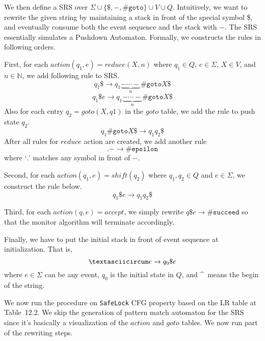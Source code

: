 \documentclass{article}
\begin{document}
\begin{enumerate}
We then define a SRS over $\Sigma \cup \{\$, -, \texttt{\#goto}\} \cup V \cup Q$.
Intuitively, we want to rewrite the given string by maintaining a stack in front
of the special symbol \$,
and eventually consume both the event sequence and the stack with $-$.
The SRS essentially simulates a Pushdown Automaton.
Formally, we constructs the rules in following orders.

First, for each $action(q_1, e) = reduce(X, n)$ where $q_1 \in Q$,
$e \in \Sigma$, $X \in V$, and $n \in \mathbb{N}$, we add following rule to SRS.
$$
    q_1\$ \to q_1 \underbrace{- \cdots -}_{n} \texttt{\#goto} X\$
$$$$
    q_1\$e \to q_1 \underbrace{- \cdots -}_{n} \texttt{\#goto} X\$
$$
Also for each entry $q_2 = goto(X, q1)$ in the $goto$ table,
we add the rule to push state $q_2$.
$$
    q_1 \texttt{\#goto} X \$ \to q_1 q_2 \$
$$
After all rules for $reduce$ action are created, we add another rule
$$
    . - \to \texttt{\#epsilon}
$$
where `$.$' matches any symbol in front of $-$.

Second, for each $action(q_1, e) = shift(q_2)$ where $q_1, q_2 \in Q$ and
$e \in \Sigma$, we construct the rule below.
$$
   q_1\$e \to q_1 q_2\$
$$

Third, for each $action(q, e) = accept$, we simply rewrite
$
    q \$ e \to \texttt{\#succeed}
$
so that the monitor algorithm will terminate accordingly.

Finally, we have to put the initial stack in front of event sequence at initialization.
That is,
$$
    \textasciicircum e \to q_0 \$ e
$$
where $e \in \Sigma$ can be any event, $q_0$ is the initial state in $Q$,
and \textasciicircum\ means the begin of the string.

We now run the procedure on \texttt{SafeLock} CFG property based on the LR table
at Table~12.2.
We skip the generation of pattern match automaton for the SRS since it's
basically a visualization of the $action$ and $goto$ tables.
We now run part of the rewriting steps. 


\end{enumerate}
\end{document}
